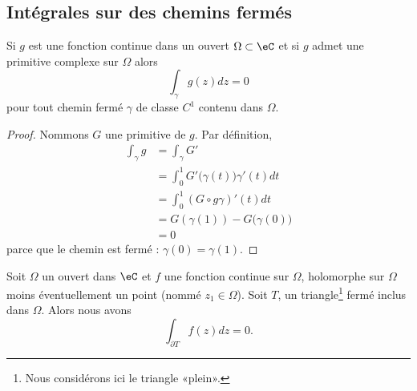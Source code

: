 \subsection{Intégrales sur des chemins fermés}

\begin{lemma}       \label{LemtpEOmi}
    Si \( g\) est une fonction continue dans un ouvert \( \Omega\subset \eC\) et si \( g\) admet une primitive complexe sur \( \Omega\) alors 
    \begin{equation}
        \int_{\gamma}g(z)dz=0
    \end{equation}
    pour tout chemin fermé \( \gamma\) de classe \( C^1\) contenu dans \( \Omega\).
\end{lemma}

\begin{proof}
    Nommons \( G\) une primitive de \( g\). Par définition,
    \begin{subequations}
        \begin{align}
            \int_{\gamma}g&=\int_{\gamma}G'\\
            &=\int_0^1G'\big( \gamma(t) \big)\gamma'(t)dt\\
            &=\int_0^1 (G\circ g\gamma)'(t)dt\\
            &=G(\gamma(1))-G\big( \gamma(0) \big)\\
            &=0
        \end{align}
    \end{subequations}
    parce que le chemin est fermé : \( \gamma(0)=\gamma(1)\).
\end{proof}

\begin{lemma}  \label{LemwbwbUR}
    Soit \( \Omega\) un ouvert dans \( \eC\) et \( f\) une fonction continue sur \( \Omega\), holomorphe sur \( \Omega\) moins éventuellement un point (nommé \( z_1\in\Omega\)). Soit \( T\), un triangle\footnote{Nous considérons ici le triangle «plein».} fermé inclus dans \( \Omega\). Alors nous avons
    \begin{equation}
        \int_{\partial T}f(z)dz=0.
    \end{equation}
\end{lemma}

